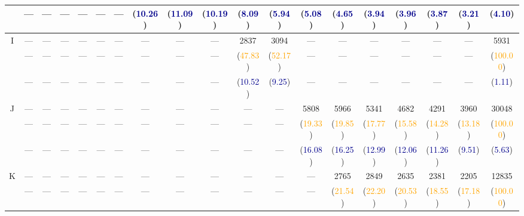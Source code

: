 {\begin{tabular}{cccccccccc|ccccccccc}
            &---&---&---&---&---&---&(\textcolor{darkblue}{10.26})&(\textcolor{darkblue}{11.09})&(\textcolor{darkblue}{10.19})&(\textcolor{darkblue}{8.09})&(\textcolor{darkblue}{5.94})&(\textcolor{darkblue}{5.08})&(\textcolor{darkblue}{4.65})&(\textcolor{darkblue}{3.94})&(\textcolor{darkblue}{3.96})&(\textcolor{darkblue}{3.87})&(\textcolor{darkblue}{3.21})&(\textcolor{darkblue}{4.10})\\\midrule
\multirow{3}{*}{I}&          ---&          ---&          ---&          ---&          ---&          ---&          ---&          ---&          ---&        2837&        3094&          ---&          ---&          ---&          ---&          ---&          ---&        5931\\
            &---&---&---&---&---&---&---&---&---&(\textcolor{orange}{47.83})&(\textcolor{orange}{52.17})&---&---&---&---&---&---&(\textcolor{orange}{100.00})\\
            &---&---&---&---&---&---&---&---&---&(\textcolor{darkblue}{10.52})&(\textcolor{darkblue}{9.25})&---&---&---&---&---&---&(\textcolor{darkblue}{1.11})\\\midrule
\multirow{3}{*}{J}&          ---&          ---&          ---&          ---&          ---&          ---&          ---&          ---&          ---&          ---&          ---&        5808&        5966&        5341&        4682&        4291&        3960&       30048\\
            &---&---&---&---&---&---&---&---&---&---&---&(\textcolor{orange}{19.33})&(\textcolor{orange}{19.85})&(\textcolor{orange}{17.77})&(\textcolor{orange}{15.58})&(\textcolor{orange}{14.28})&(\textcolor{orange}{13.18})&(\textcolor{orange}{100.00})\\
            &---&---&---&---&---&---&---&---&---&---&---&(\textcolor{darkblue}{16.08})&(\textcolor{darkblue}{16.25})&(\textcolor{darkblue}{12.99})&(\textcolor{darkblue}{12.06})&(\textcolor{darkblue}{11.26})&(\textcolor{darkblue}{9.51})&(\textcolor{darkblue}{5.63})\\\midrule
\multirow{3}{*}{K}&          ---&          ---&          ---&          ---&          ---&          ---&          ---&          ---&          ---&          ---&          ---&          ---&        2765&        2849&        2635&        2381&        2205&       12835\\
            &---&---&---&---&---&---&---&---&---&---&---&---&(\textcolor{orange}{21.54})&(\textcolor{orange}{22.20})&(\textcolor{orange}{20.53})&(\textcolor{orange}{18.55})&(\textcolor{orange}{17.18})&(\textcolor{orange}{100.00})\\

\end{tabular}}
